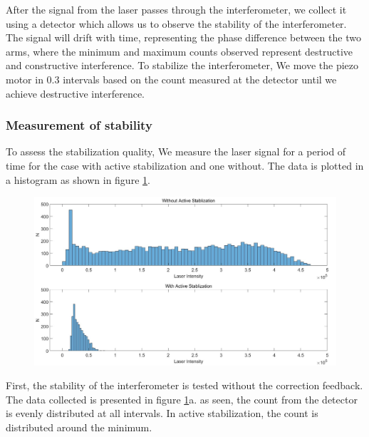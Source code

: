  After the signal from the laser passes through the interferometer, we collect it using a detector which allows us to observe the stability of the interferometer. The signal will drift with time, representing the  phase difference between the two arms, where the minimum and maximum counts observed represent destructive and constructive interference. To stabilize the interferometer, We move the piezo motor in 0.3 intervals based on the count measured at the detector until we achieve destructive interference.
\subsubsection{Measurement of stability}
To assess the stabilization quality, We measure the laser signal for a period of time for the case with active stabilization and one without. The data is plotted in a histogram as shown in figure \ref{fig:stablization_histogram}.
\begin{figure}[H]
	\centering
	\includegraphics[scale=0.32]{figures/StablizationHistogram.jpg}
	\caption{}
	\label{fig:stablization_histogram}
\end{figure}
First, the stability of the interferometer is tested without the correction feedback. The data collected is presented in figure \ref{fig:stablization_histogram}a. as seen, the count from the detector is evenly distributed at all intervals. In active stabilization, the count is distributed around the minimum.